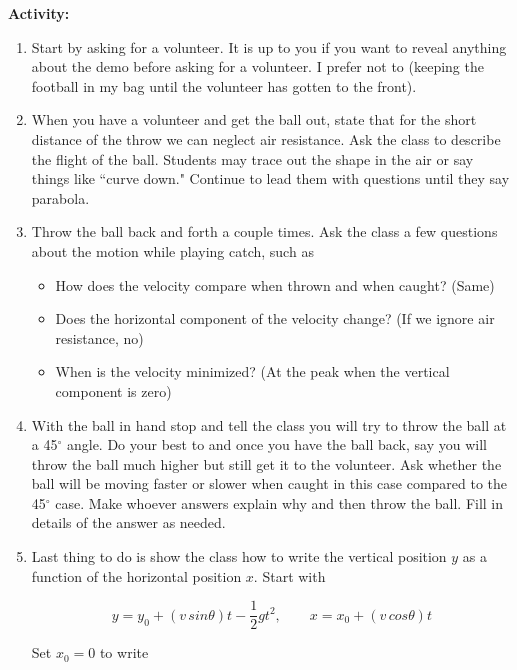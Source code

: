 \documentclass{article}
\begin{document}
\textbf{Activity:}
\begin{enumerate}
\item Start by asking for a volunteer. It is up to you if you want to reveal anything about the demo before asking for a volunteer. I prefer not to (keeping the football in my bag until the volunteer has gotten to the front).

\item When you have a volunteer and get the ball out, state that for the short distance of the throw we can neglect air resistance. Ask the class to describe the flight of the ball.  Students may trace out the shape in the air or say things like ``curve down." Continue to lead them with questions until they say parabola. 

\item Throw the ball back and forth a couple times. Ask the class a few questions about the motion while playing catch, such as

\begin{itemize}
\item How does the velocity compare when thrown and when caught? (Same)
\item Does the horizontal component of the velocity change? (If we ignore air resistance, no)
\item When is the velocity minimized? (At the peak when the vertical component is zero)
\end{itemize}

\item With the ball in hand stop and tell the class you will try to throw the ball at a 45$^\circ$ angle. Do your best to and once you have the ball back, say you will throw the ball much higher but still get it to the volunteer. Ask whether the ball will be moving faster or slower when caught in this case compared to the 45$^\circ$ case. Make whoever answers explain why and then throw the ball. Fill in details of the answer as needed.

\item Last thing to do is show the class how to write the vertical position $y$ as a function of the horizontal position $x$. Start with

\begin{equation}
	y = y_0 + (v \, sin \theta)t - \frac{1}{2} g t^2, \qquad x = x_0 + (v \, cos \theta) t
\end{equation}



Set $x_0 = 0$ to write


\end{enumerate}
\end{document}
